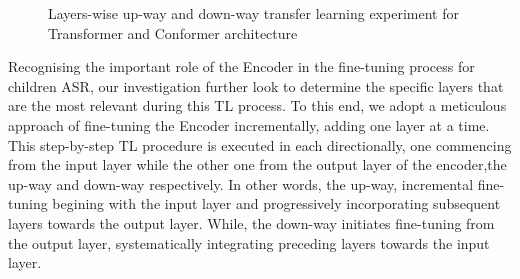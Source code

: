 \begin{figure}[ht]
    \centering
    \caption{Layers-wise up-way and down-way transfer learning experiment for Transformer and Conformer architecture}
\end{figure}

Recognising the important role of the Encoder in the fine-tuning process for children ASR, our investigation further look to determine the specific layers that are the most relevant during this TL process. To this end, we adopt a meticulous approach of fine-tuning the Encoder incrementally, adding one layer at a time. This step-by-step TL procedure is executed in each directionally, one commencing from the input layer while the other one from the output layer of the encoder,the up-way and down-way respectively. In other words, the up-way, incremental fine-tuning begining with the input layer and progressively incorporating subsequent layers towards the output layer. While, the down-way initiates fine-tuning from the output layer, systematically integrating preceding layers towards the input layer.

